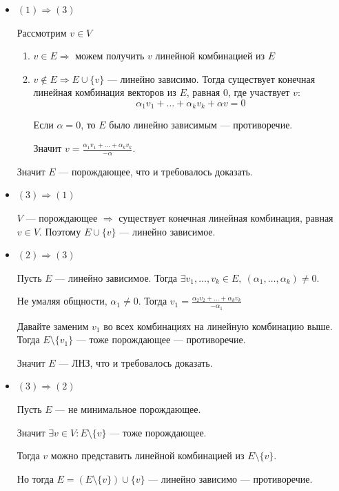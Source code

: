 \begin{itemize}
    \item
        \( (1) \Rightarrow (3) \)

        Рассмотрим \( v \in V \)
        \begin{enumerate}
            \item
                \( v \in E \Rightarrow \) можем получить \( v \) линейной комбинацией из \( E \)
            \item
                \( v \notin E \Rightarrow E \cup \{ v \} \) --- линейно зависимо.
                Тогда существует конечная линейная комбинация векторов из \( E \),
                равная \( 0 \), где участвует \( v \):
                \[
                    \alpha_1 v_1 + \ldots + \alpha_k v_k + \alpha v = 0
                \]

                Если \( \alpha = 0 \), то \( E \) было линейно зависимым --- противоречие.

                Значит \( \displaystyle v = \frac{\alpha_1 v_1 + \ldots + \alpha_k v_k}{-\alpha} \).
        \end{enumerate}

        Значит \( E \) --- порождающее, что и требовалось доказать.
    \item
        \( (3) \Rightarrow (1) \)

        \( V \) --- порождающее \( \Rightarrow \) существует конечная линейная комбинация,
        равная \( v \in V \).
        Поэтому \( E \cup \{ v \} \) --- линейно зависимое.
    \item
        \( (2) \Rightarrow (3) \)

        Пусть \( E \) --- линейно зависимое.
        Тогда \( \exists v_1, \ldots, v_k \in E, \ (\alpha_1, \ldots, \alpha_k) \neq 0 \).

        Не умаляя общности, \( \alpha_1 \neq 0 \).
        Тогда \( \displaystyle v_1 = \frac{\alpha_2 v_2 + \ldots + \alpha_k v_k}{-\alpha_1} \)

        Давайте заменим \( v_1 \) во всех комбинациях на линейную комбинацию выше.
        Тогда \( E \setminus \{ v_1 \} \) --- тоже порождающее --- противоречие.

        Значит \( E \) --- ЛНЗ, что и требовалось доказать.
    \item
        \( (3) \Rightarrow (2) \)

        Пусть \( E \) --- не минимальное порождающее.

        Значит \( \exists v \in V : E \setminus \{ v \} \) --- тоже порождающее.

        Тогда \( v \) можно представить линейной комбинацией из \( E \setminus \{ v \} \).

        Но тогда \( E = (E \setminus \{ v \}) \cup \{ v \} \) --- линейно зависимо --- противоречие.
\end{itemize}

